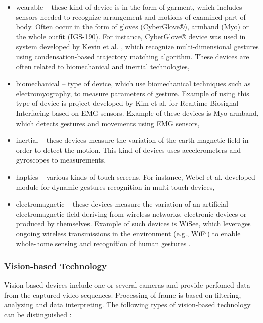 \begin{itemize}

\item wearable -- these kind of device is in the form of garment, which includes sensors needed to recognize arrangement and motions of examined part of body. Often occur in the form of gloves (CyberGlove®), armband (Myo) or the whole outfit (IGS-190). For instance, CyberGlove® device was used in system developed by Kevin et al. \cite{KevinCyberGloves}, which recognize multi-dimensional gestures using condensation-based trajectory matching algorithm. These devices are often related to biomechanical and inertial technologies, 

\item biomechanical -- type of device, which use biomechanical techniques such as electromyography, to measure parameters of gesture. Example of using this type of device is project developed by Kim et al. \cite{Kim:2008:EHG:1378773.1378778} for Realtime Biosignal Interfacing based on EMG sensors. Example of these devices is Myo armband, which detects gestures and movements using EMG sensors,

\item inertial -- these devices measure the variation of the earth magnetic field in order to detect the motion. This kind of devices uses accelerometers \cite{LiuAccelerometer} and gyroscopes \cite{TUD-CS-2009-0292} to measurements,

\item haptics -- various kinds of touch screens. For instance, Webel et al. \cite{conf/vrst/WebelKZ08} developed module for dynamic gestures recognition in multi-touch devices,

\item electromagnetic -- these devices measure the variation of an artificial electromagnetic field deriving from wireless networks, electronic devices or produced by themselves. Example of such devices is WiSee, which leverages ongoing wireless transmissions in the environment (e.g., WiFi) to enable whole-home sensing and recognition of human gestures \cite{Pu:2013:WGR:2500423.2500436}.

\end{itemize}

\subsubsection{Vision-based Technology}

Vision-based devices include one or several cameras and provide perfomed data from the captured video sequences. Processing of frame is based on filtering, analyzing and data interpreting. The following types of vision-based technology can be distinguished \cite{kaaniche2009human}\cite{Wu:1999:VGR:647591.728702}:

